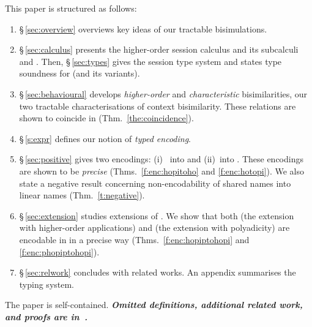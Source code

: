  This paper 
is structured as follows:
\begin{enumerate}[$\bullet$]
\item \S\,\ref{sec:overview} overviews key ideas of our tractable bisimulations.
\item \S\,\ref{sec:calculus} presents the higher-order session calculus \HOp and its 
subcalculi \HO and \sessp.  Then, \S\,\ref{sec:types} gives the session type system
and states type soundness for \HOp (and its variants).
\item \S\,\ref{sec:behavioural} 
develops \emph{higher-order} and \emph{characteristic} bisimilarities, our two
tractable characterisations of context bisimilarity. These 
relations are shown to coincide in \HOp (Thm.~\ref{the:coincidence}).
\item \S\,\ref{s:expr} defines  our notion of \emph{typed encoding}.
\item \S\,\ref{sec:positive} %
gives two encodings: (i)~ \HOp into \HO and (ii)~\HOp into \sessp.
These encodings 
are shown to be \emph{precise} (Thms.~\ref{f:enc:hopitoho} and \ref{f:enc:hotopi}).
We also state a negative result concerning non-encodability of shared names
into linear names (Thm.~\ref{t:negative}).

\item \S\,\ref{sec:extension} studies extensions of \HOp. We show that 
both \HOpp (the extension with higher-order applications) 
and \pHOp (the extension with polyadicity) are encodable in \HOp in a precise way
(Thms.~\ref{f:enc:hopiptohopi} and \ref{f:enc:phopiptohopi}).
\item \S\,\ref{sec:relwork} concludes with related works. An appendix summarises the typing system. 
\end{enumerate}
\noi
The paper is self-contained. 
{\bf\em Omitted definitions, additional related work, and  proofs 
are 
in~\cite{KouzapasPY15}.} 

